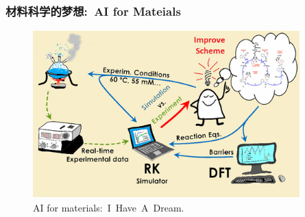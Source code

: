 \frame
{
	\frametitle{材料科学的梦想:~\textrm{AI for Mateials}}
\begin{figure}[h!]
\vspace*{-0.18in}
\centering
\includegraphics[height=2.55in,width=4.05in]{Figures/Schematic_Material-Design.png}
\caption{\tiny \textrm{AI for materials:~I~Have~A~Dream.}}%
\label{Schematic_Material-Design}
\end{figure} 
}

